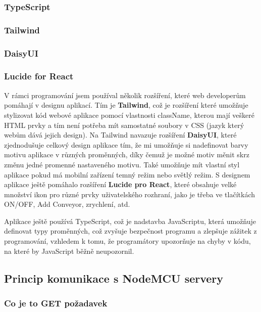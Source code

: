 \subsubsection{TypeScript}

\subsubsection{Tailwind}

\subsubsection{DaisyUI}

\subsubsection{Lucide for React}

V rámci programování jsem používal několik rozšíření, které web developerům pomáhají v designu aplikací. Tím je \textbf{Tailwind}, což je rozšíření které umožňuje stylizovat kód webové aplikace pomocí vlastnosti className, kterou mají veškeré HTML prvky a tím není potřeba mít samostatné soubory v CSS (jazyk který webům dává jejich design). Na Tailwind navazuje rozšíření \textbf{DaisyUI}, které zjednodušuje celkový design aplikace tím, že mi umožňuje si nadefinovat barvy motivu aplikace v různých proměnných, díky čemuž je možné motiv měnit skrz změnu jedné promenné nastaveného motivu. Také umožňuje mít vlastní styl aplikace pokud má mobilní zařízení temný režim nebo světlý režim. S designem aplikace ještě pomáhalo rozšíření \textbf{Lucide pro React}, které obsahuje velké množství ikon pro různé prvky uživatelského rozhraní, jako je třeba ve tlačítkách ON/OFF, Add Conveyor, zrychlení, atd.

Aplikace ještě používá TypeScript, což je nadstavba JavaScriptu, která umožňuje definovat typy proměnných, což zvyšuje bezpečnost programu a zlepšuje zážitek z programování, vzhledem k tomu, že programátory upozorňuje na chyby v kódu, na které by JavaScript běžně neupozornil.

\subsection{Princip komunikace s NodeMCU servery}


\subsubsection{Co je to GET požadavek }

